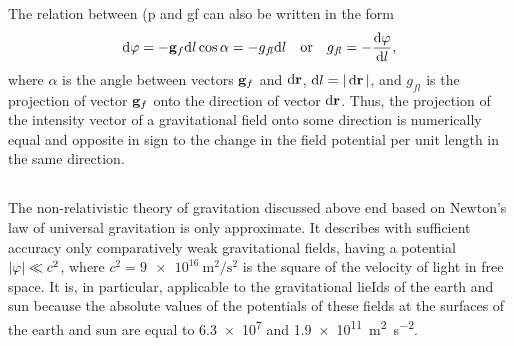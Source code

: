 The relation between (p and gf can also be written in the form
\begin{equation*}%
\dd \varphi = - \vb{g}_{f} \dd l \cos \alpha = -g_{f\!l} \dd l \quad \textrm{or} \quad g_{f\!l} = - \frac{\dd \varphi}{\dd l},
\end{equation*}
where $\alpha$ is the angle between vectors $\vb{g}_{f}$ and $\dd \vb{r}$, $\dd l = \abs{\,\dd \vb{r}\,}$, and $g_{f\!l}$ is the projection of vector $\vb{g}_{f}$ onto the direction of vec­tor $\dd \vb{r}$. Thus, the projection of the intensity vector of a gravita­tional field onto some direction is numerically equal and opposite in sign to the change in the field potential per unit length in the same direction.

\subsection{}\label{6.2.6} The non-relativistic theory of gravitation discussed above end based on Newton's law of universal gravitation is only approximate. It describes with sufficient accuracy only comparatively weak gravitational fields, having a potential $\abs{\varphi}\ll c^{2}$, where $c^{2} = \SI{9e16}{\meter\squared\per\second\squared}$ is the square of the velocity of light in free space. It is, in particular, applicable to the gravitational lieIds of the earth and sun because the absolute values of the potentials of these fields at the surfaces of the earth and sun are equal to \num{6.3e7} and \SI{1.9e11}{\meter\squared\per\second\squared}.

